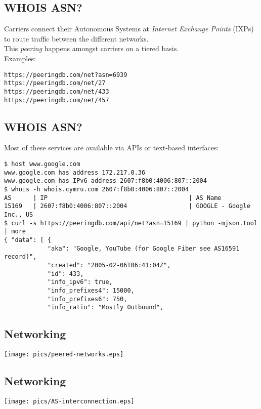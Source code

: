 \documentclass[xga]{xdvislides}
\begin{document}
\subsection{WHOIS ASN?}
Carriers connect their Autonomous Systems at {\em
Internet Exchange Points} (IXPs) to route traffic
between the different networks.\\

This {\em peering} happens amongst carriers on a
tiered basis. \\

Examples:
\begin{verbatim}
https://peeringdb.com/net?asn=6939
https://peeringdb.com/net/27
https://peeringdb.com/net/433
https://peeringdb.com/net/457
\end{verbatim}

\subsection{WHOIS ASN?}
Most of these services are available via APIs or
text-based interfaces:

\begin{verbatim}
$ host www.google.com
www.google.com has address 172.217.0.36
www.google.com has IPv6 address 2607:f8b0:4006:807::2004
$ whois -h whois.cymru.com 2607:f8b0:4006:807::2004
AS      | IP                                       | AS Name
15169   | 2607:f8b0:4006:807::2004                 | GOOGLE - Google Inc., US
$ curl -s https://peeringdb.com/api/net?asn=15169 | python -mjson.tool | more
{ "data": [ {
            "aka": "Google, YouTube (for Google Fiber see AS16591 record)",
            "created": "2005-02-06T06:41:04Z",
            "id": 433,
            "info_ipv6": true,
            "info_prefixes4": 15000,
            "info_prefixes6": 750,
            "info_ratio": "Mostly Outbound",
\end{verbatim}

\subsection{Networking}
\vspace*{\fill}
\begin{center}
	\texttt{[image: pics/peered-networks.eps]} \\
\end{center}
\vspace*{\fill}

\subsection{Networking}
\vspace*{\fill}
\begin{center}
	\texttt{[image: pics/AS-interconnection.eps]} \\
\end{center}
\vspace*{\fill}
\end{document}
